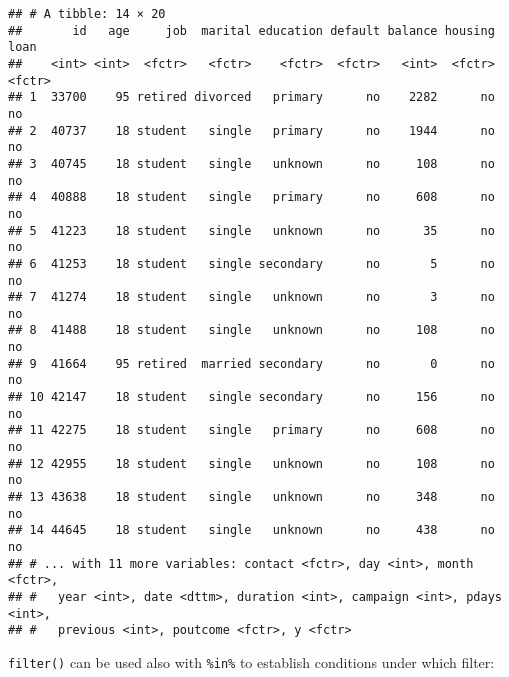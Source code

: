 \documentclass[]{book}
\newenvironment{Shaded}{\begin{snugshade}}{\end{snugshade}}
\newcommand{\KeywordTok}[1]{\textcolor[rgb]{0.13,0.29,0.53}{\textbf{{#1}}}}
\newcommand{\DecValTok}[1]{\textcolor[rgb]{0.00,0.00,0.81}{{#1}}}
\newcommand{\StringTok}[1]{\textcolor[rgb]{0.31,0.60,0.02}{{#1}}}
\newcommand{\CommentTok}[1]{\textcolor[rgb]{0.56,0.35,0.01}{\textit{{#1}}}}
\newcommand{\NormalTok}[1]{{#1}}
\begin{document}
\begin{Shaded}
\end{Shaded}

\begin{verbatim}
## # A tibble: 14 × 20
##       id   age     job  marital education default balance housing   loan
##    <int> <int>  <fctr>   <fctr>    <fctr>  <fctr>   <int>  <fctr> <fctr>
## 1  33700    95 retired divorced   primary      no    2282      no     no
## 2  40737    18 student   single   primary      no    1944      no     no
## 3  40745    18 student   single   unknown      no     108      no     no
## 4  40888    18 student   single   primary      no     608      no     no
## 5  41223    18 student   single   unknown      no      35      no     no
## 6  41253    18 student   single secondary      no       5      no     no
## 7  41274    18 student   single   unknown      no       3      no     no
## 8  41488    18 student   single   unknown      no     108      no     no
## 9  41664    95 retired  married secondary      no       0      no     no
## 10 42147    18 student   single secondary      no     156      no     no
## 11 42275    18 student   single   primary      no     608      no     no
## 12 42955    18 student   single   unknown      no     108      no     no
## 13 43638    18 student   single   unknown      no     348      no     no
## 14 44645    18 student   single   unknown      no     438      no     no
## # ... with 11 more variables: contact <fctr>, day <int>, month <fctr>,
## #   year <int>, date <dttm>, duration <int>, campaign <int>, pdays <int>,
## #   previous <int>, poutcome <fctr>, y <fctr>
\end{verbatim}

\texttt{filter()} can be used also with \texttt{\%in\%} to establish
conditions under which filter:

\begin{Shaded}
\end{Shaded}
\end{document}
